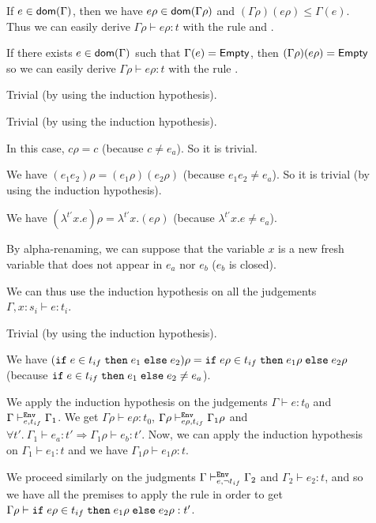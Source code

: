 \documentclass[a4paper]{article}
\theoremstyle{definition}
\begin{document}
        \begin{description}
          \item[] If $e\in\textsf{dom}(\Gamma)$, then we have $e\rho\in\textsf{dom}(\Gamma\rho)$ and $(\Gamma\rho)(e\rho)\leq\Gamma(e)$.
          Thus we can easily derive $\Gamma\rho\vdash e\rho:t$ with the rule  and .
          \item[] If there exists $e\in\textsf{dom}(\Gamma)$ such that $\Gamma(e)=\textsf{Empty}$, then $(\Gamma\rho)(e\rho)=\textsf{Empty}$
          so we can easily derive $\Gamma\rho\vdash e\rho:t$ with the rule .
          \item[] Trivial (by using the induction hypothesis).
          \item[] Trivial (by using the induction hypothesis).
          \item[] In this case, $c\rho = c$ (because $c \neq e_a$). So it is trivial.
          \item[] We have $(e_1 e_2)\rho = (e_1\rho) (e_2\rho)$ (because $e_1 e_2 \neq e_a$).
          So it is trivial (by using the induction hypothesis).
          \item[] We have $(\lambda^{t'}x.e)\rho = \lambda^{t'}x.(e\rho)$ (because $\lambda^{t'}x.e \neq e_a$).
          
          By alpha-renaming, we can suppose that the variable $x$ is a new fresh variable that does not appear
          in $e_a$ nor $e_b$ ($e_b$ is closed).
          
          We can thus use the induction hypothesis on all the judgements $\Gamma, x:s_i \vdash e:t_i$.
          \item[] Trivial (by using the induction hypothesis).
          \item[]
          We have $(\texttt{if}\;e\in t_{if}\;\texttt{then}\;e_1\;\texttt{else}\;e_2)\rho = \texttt{if}\;e\rho\in t_{if}\;\texttt{then}\;e_1\rho\;\texttt{else}\;e_2\rho$ (because $\texttt{if}\;e\in t_{if}\;\texttt{then}\;e_1\;\texttt{else}\;e_2 \neq e_a$).

          We apply the induction hypothesis on the judgements $\Gamma\vdash e:t_0$ and $\Gamma\vdash^{\texttt{Env}}_{e,t_{if}} \Gamma_1$.
          We get $\Gamma\rho\vdash e\rho:t_0$, $\Gamma\rho\vdash^{\texttt{Env}}_{e\rho,t_{if}} \Gamma_1\rho$ and
          $\forall t'.\ \Gamma_1 \vdash e_a : t' \Rightarrow \Gamma_1\rho \vdash e_b:t'$.
          Now, we can apply the induction hypothesis on $\Gamma_1\vdash e_1:t$ and we have $\Gamma_1\rho\vdash e_1\rho:t$.

          We proceed similarly on the judgments $\Gamma\vdash^{\texttt{Env}}_{e,\neg t_{if}} \Gamma_2$ and $\Gamma_2\vdash e_2:t$, and so we have all the premises
          to apply the  rule in order to get $\Gamma\rho \vdash \texttt{if}\;e\rho\in t_{if}\;\texttt{then}\;e_1\rho\;\texttt{else}\;e_2\rho:t'$. 


\end{description}
\end{document}
